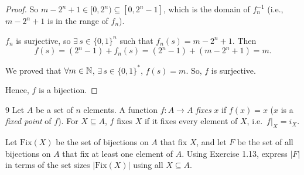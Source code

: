 \begin{solbox}[long]
\begin{solution}[(a)]
\begin{proof}
    So $m-2^n+1 \in [0,2^n) \subseteq [0,2^n-1]$, which is the domain of
    $f_n^{-1}$ (i.e., $m-2^n+1$ is in the range of $f_n$).

    $f_n$ is surjective, so $\exists\, s\in\{0,1\}^n$ such that
    $f_n(s) = m-2^n+1$. Then
    \[
        f(s) = (2^n-1) + f_n(s) = (2^n-1) + (m-2^n+1) = m.
    \]

    We proved that $\forall m\in\mathbb{N}$, $\exists\, s\in\{0,1\}^*$, $f(s)=m$.
    So, $f$ is surjective.

    Hence, $f$ is a bijection.
\end{proof}

\end{solution}
\end{solbox}

\begin{exercise}{9}
    Let $A$ be a set of $n$ elements. A function $f:A\to A$ \emph{fixes} $x$ if
    $f(x)=x$ ($x$ is a \emph{fixed point} of $f$). For $X\subseteq A$, $f$ fixes
    $X$ if it fixes every element of $X$, i.e.\ $f|_X = i_X$.

    Let $\mathrm{Fix}(X)$ be the set of bijections on $A$ that fix $X$, and let
    $F$ be the set of all bijections on $A$ that fix at least one element of $A$.
    Using Exercise 1.13, express $|F|$ in terms of the set sizes
    $|\mathrm{Fix}(X)|$ using all $X\subseteq A$.
\end{exercise}
\begin{solbox}
\begin{solution}

\end{solution}
\end{solbox}


